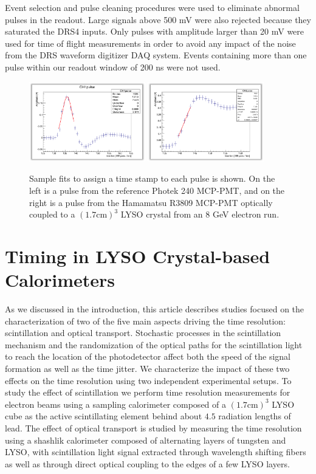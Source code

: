 \documentclass[12pt]{article}
\begin{document}
Event selection and pulse cleaning procedures were used to eliminate abnormal
pulses in the readout. Large signals above 500 mV were also rejected because
they saturated the DRS4 inputs. Only pulses with amplitude 
larger than 20 mV were used for time of flight measurements in order to 
avoid any impact of the noise from the DRS waveform digitizer DAQ system. 
Events containing more than one pulse within our readout window of 200 ns 
were not used. 

\begin{figure}[h] \centering
\includegraphics[width=0.45\textwidth]{figs/RefPulseFit} 
\includegraphics[width=0.45\textwidth]{figs/ScintPulseFit} 
\caption{Sample fits to assign a time stamp to each pulse is shown. 
On the left is a pulse from the reference Photek 240 MCP-PMT, and
on the right is a pulse from the Hamamatsu R3809 MCP-PMT
optically coupled to a $(1.7\mathrm{ cm})^3$  LYSO crystal
from an 8 GeV electron run.}
\label{fig:PulseFits}
\end{figure}


\section{Timing in LYSO Crystal-based Calorimeters}

As we discussed in the introduction, this article describes studies
focused on the characterization of two of the five main aspects
driving the time resolution: scintillation and 
optical transport. Stochastic processes in the scintillation
mechanism and the randomization of the optical paths for the 
scintillation light to reach the location of the photodetector 
affect both the speed of the signal formation
as well as the time jitter. We characterize the impact of
these two effects on the time resolution using
two independent experimental setups. To study the effect of scintillation
we perform time resolution measurements
for electron beams using a sampling calorimeter composed of a 
$(1.7\mathrm{ cm})^{3}$ LYSO cube as the active 
scintillating element behind about $4.5$ radiation lengths of lead. 
The effect of optical transport is studied by measuring
the time resolution using a shashlik 
calorimeter composed of alternating layers of tungsten
and LYSO, with scintillation light signal extracted
through wavelength shifting fibers as well as 
through direct optical coupling to the edges of a few
LYSO layers. 
\end{document}
